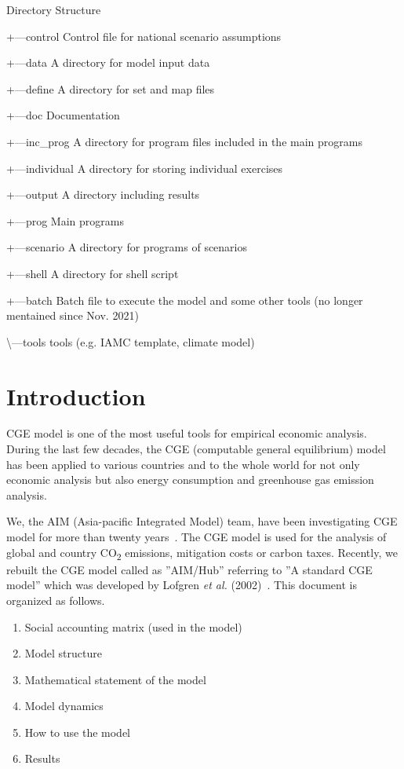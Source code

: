 \documentclass[10pt,a4paper,titlepage,dvipdfmx]{book}
\begin{document}
Directory Structure

{\textbar}   

+---control    Control file for national scenario assumptions

+---data     A directory for model input data

+---define    A directory for set and map files

+---doc     Documentation

+---inc\_prog    A directory for program files included in the main programs

+---individual    A directory for storing individual exercises

+---output    A directory including results

+---prog     Main programs

+---scenario    A directory for programs of scenarios

+---shell    A directory for shell script

+---batch    Batch file to execute the model and some other tools (no longer mentained since Nov. 2021) 

\textbackslash ---tools     tools (e.g. IAMC template, climate model)


\tableofcontents

\listoffigures

\listoftables

\chapter{Introduction\label{chp:Intro}}

 CGE model is one of the most useful tools for empirical economic analysis. During the last few decades, the CGE (computable general equilibrium) model has been applied to various countries and to the whole world for not only economic analysis but also energy consumption and greenhouse gas emission analysis. 

 We, the AIM (Asia-pacific Integrated Model) team, have been investigating CGE model for more than twenty years~\cite{RN2892}. The CGE model is used for the analysis of global and country CO\textsubscript{2} emissions, mitigation costs or carbon taxes. Recently, we rebuilt the CGE model called as ''AIM/Hub'' referring to ''A standard CGE model'' which was developed by Lofgren \textit{et al.} (2002)~\cite{RN2739}. This document is organized as follows.
\begin{enumerate}[{(1)}]
\item Social accounting matrix (used in the model)
\item Model structure
\item Mathematical statement of the model
\item Model dynamics
\item How to use the model
\item Results
\end{enumerate}
\end{document}
